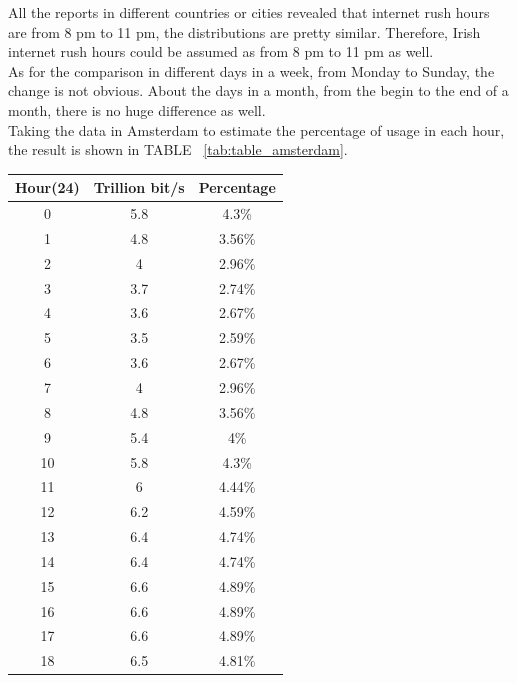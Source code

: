 \documentclass[conference]{IEEEtran}
\begin{document}
All the reports in different countries or cities revealed that internet rush hours are from 8 pm to 11 pm, the distributions are pretty similar. Therefore, Irish internet rush hours could be assumed as from 8 pm to 11 pm as well. 
\\

As for the comparison in different days in a week, from Monday to Sunday, the change is not obvious. About the days in a month, from the begin to the end of a month, there is no huge difference as well.
\\

Taking the data in Amsterdam to estimate the percentage of usage in each hour, the result is shown in TABLE ~\ref{tab:table_amsterdam}.
\\

\begin{table}[hbt!]
    \centering
    \begin{tabular}{|c|c|c|}
        \hline
         Hour(24) & Trillion bit/s & Percentage\\
        \hline
        0 & 5.8 & 4.3\% \\
        \hline
        1 & 4.8 & 3.56\% \\
        \hline
        2 & 4 & 2.96\% \\
        \hline
        3 & 3.7 & 2.74\% \\
        \hline
        4 & 3.6 & 2.67\% \\
        \hline
        5 & 3.5 & 2.59\% \\
        \hline
        6 & 3.6 & 2.67\%  \\
        \hline
        7 & 4 & 2.96\%  \\
        \hline
        8 & 4.8 & 3.56\%  \\
        \hline
        9 & 5.4 & 4\%  \\
        \hline
        10 & 5.8 & 4.3\%  \\
        \hline
        11 & 6 & 4.44\% \\
        \hline
        12 & 6.2 & 4.59\%  \\
        \hline
        13 & 6.4 & 4.74\%  \\
        \hline
        14 & 6.4 & 4.74\%  \\
        \hline
        15 & 6.6 & 4.89\%  \\
        \hline
        16 & 6.6 & 4.89\%  \\
        \hline
        17 & 6.6 & 4.89\%  \\
        \hline
        18 & 6.5 & 4.81\%  \\

\end{tabular}
\end{table}
\end{document}
